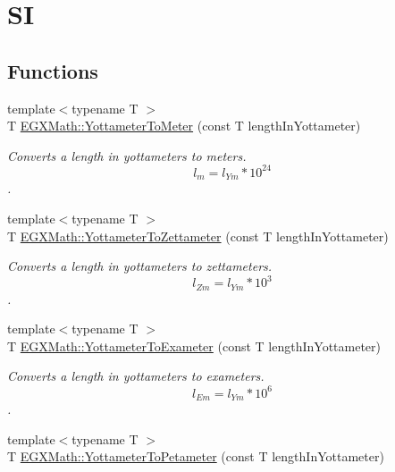 \hypertarget{group___e_g_x_math-_conversions-_length_conversions-_s_i-_yottameter-_s_i}{}\section{SI}
\label{group___e_g_x_math-_conversions-_length_conversions-_s_i-_yottameter-_s_i}
\subsection*{Functions}
\begin{DoxyCompactItemize}
\item 
{\footnotesize template$<$typename T $>$ }\\T \mbox{\hyperlink{group___e_g_x_math-_conversions-_length_conversions-_s_i-_yottameter-_s_i_ga01c4f2e699cc2b062bdd2e81073a7ef2}{E\+G\+X\+Math\+::\+Yottameter\+To\+Meter}} (const T length\+In\+Yottameter)
\begin{DoxyCompactList}\small\item\em Converts a length in yottameters to meters. \[ l_{m}=l_{Ym} * 10^{24} \]. \end{DoxyCompactList}\item 
{\footnotesize template$<$typename T $>$ }\\T \mbox{\hyperlink{group___e_g_x_math-_conversions-_length_conversions-_s_i-_yottameter-_s_i_gaec75915fd3b267aeff37cc104cfb3e9a}{E\+G\+X\+Math\+::\+Yottameter\+To\+Zettameter}} (const T length\+In\+Yottameter)
\begin{DoxyCompactList}\small\item\em Converts a length in yottameters to zettameters. \[ l_{Zm}=l_{Ym} * 10^{3} \]. \end{DoxyCompactList}\item 
{\footnotesize template$<$typename T $>$ }\\T \mbox{\hyperlink{group___e_g_x_math-_conversions-_length_conversions-_s_i-_yottameter-_s_i_ga596bb0befe41a04cc5e193786ccc8de7}{E\+G\+X\+Math\+::\+Yottameter\+To\+Exameter}} (const T length\+In\+Yottameter)
\begin{DoxyCompactList}\small\item\em Converts a length in yottameters to exameters. \[ l_{Em}=l_{Ym} * 10^{6} \]. \end{DoxyCompactList}\item 
{\footnotesize template$<$typename T $>$ }\\T \mbox{\hyperlink{group___e_g_x_math-_conversions-_length_conversions-_s_i-_yottameter-_s_i_gaf4b5d397ea5debc0bd5195ad3a5c23d5}{E\+G\+X\+Math\+::\+Yottameter\+To\+Petameter}} (const T length\+In\+Yottameter)

\end{DoxyCompactItemize}
